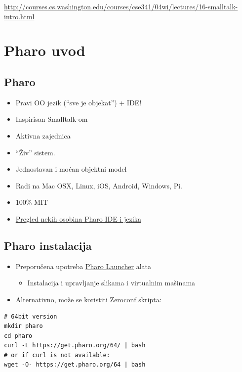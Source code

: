 \documentclass[presentation]{beamer}
\begin{document}
\url{http://courses.cs.washington.edu/courses/cse341/04wi/lectures/16-smalltalk-intro.html}

\section{Pharo uvod}
\label{sec:org382525c}
\subsection{Pharo}
\label{sec:orga0c09f7}

\begin{itemize}
\item Pravi OO jezik (``sve je objekat'') + IDE!
\item Inspirisan Smalltalk-om
\item Aktivna zajednica
\item ``Živ'' sistem.
\item Jednostavan i moćan objektni model
\item Radi na Mac OSX, Linux, iOS, Android, Windows, Pi.
\item 100\% MIT
\item \href{https://github.com/pavel-krivanek/pharoMaterials/blob/master/features/PharoKeyFeatures.md}{Pregled nekih osobina Pharo IDE i jezika}
\end{itemize}

\subsection{Pharo instalacija}
\label{sec:orge29b852}

\begin{itemize}
\item Preporučena upotreba \href{https://pharo.org/download}{Pharo Launcher} alata
\begin{itemize}
\item Instalacija i upravljanje slikama i virtualnim mašinama
\end{itemize}

\item Alternativno, može se koristiti \href{http://get.pharo.org/}{Zeroconf skripta}:
\end{itemize}

\begin{verbatim}
# 64bit version
mkdir pharo
cd pharo
curl -L https://get.pharo.org/64/ | bash
# or if curl is not available:
wget -O- https://get.pharo.org/64 | bash
\end{verbatim}
\end{document}

